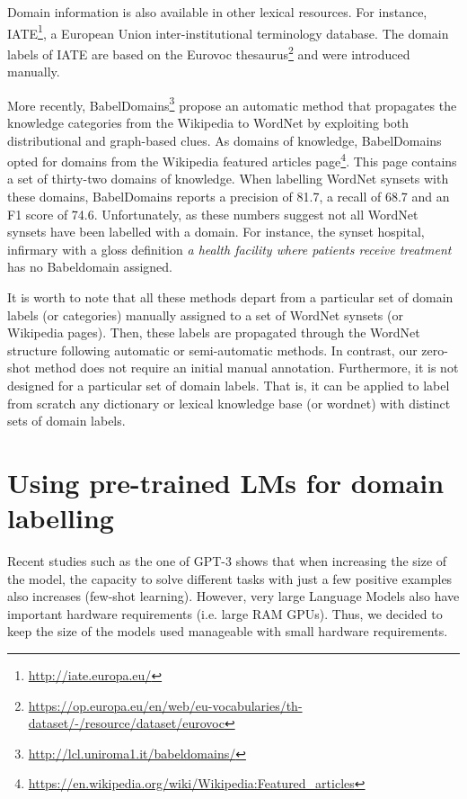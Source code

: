 \documentclass[11pt]{article}
\begin{document}
Domain information is also available in other lexical resources. For instance, IATE\footnote{\url{http://iate.europa.eu/}}, a European Union inter-institutional terminology database. The domain labels of IATE are based on the Eurovoc thesaurus\footnote{\url{https://op.europa.eu/en/web/eu-vocabularies/th-dataset/-/resource/dataset/eurovoc}} and were introduced manually.





More recently, BabelDomains\footnote{\url{http://lcl.uniroma1.it/babeldomains/}} \cite{camacho2017} propose an automatic method that propagates the knowledge categories from the Wikipedia to WordNet by exploiting both distributional and graph-based clues. As  domains  of  knowledge,  BabelDomains  opted for  domains from the Wikipedia featured articles page\footnote{\url{https://en.wikipedia.org/wiki/Wikipedia:Featured_articles}}. This  page  contains  a  set  of  thirty-two domains of knowledge. When labelling WordNet synsets with these domains, BabelDomains reports a precision of 81.7, a recall of 68.7 and an F1 score of 74.6. Unfortunately, as these numbers suggest not all WordNet synsets have been labelled with a domain. For instance, the synset hospital, infirmary with a gloss definition {\it a health facility where patients receive treatment} has no Babeldomain assigned.

It is worth to note that all these methods depart from a particular set of domain labels (or categories) manually assigned to a set of WordNet synsets (or Wikipedia pages). Then, these labels are propagated through the WordNet structure following automatic or semi-automatic methods. In contrast, our zero-shot method does not require an initial manual annotation. Furthermore, it is not designed for a particular set of domain labels. That is, it can be applied to label from scratch any dictionary or lexical knowledge base (or wordnet) with distinct sets of domain labels.




\section{Using pre-trained LMs for domain labelling}
\label{methodology}

Recent studies such as the one of GPT-3 \cite{gpt-3} shows that when increasing the size of the model, the capacity to solve different tasks with just a few positive examples also increases (few-shot learning). However, very large Language Models also have important hardware requirements (i.e. large RAM GPUs). Thus, we decided to keep the size of the models used manageable with small hardware requirements.
\end{document}
